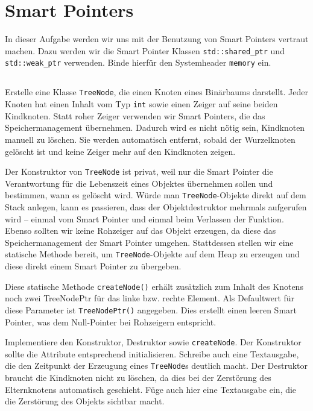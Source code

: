 \section{\ExercisePrefixMemory Smart Pointers}
In dieser Aufgabe werden wir uns mit der Benutzung von Smart Pointers vertraut machen. Dazu werden wir die Smart Pointer Klassen \lstinline{std::shared_ptr} und \lstinline{std::weak_ptr} verwenden. Binde hierfür den Systemheader \lstinline{memory} ein.


\subsection{}
Erstelle eine Klasse \lstinline{TreeNode}, die einen Knoten eines Binärbaums darstellt.
Jeder Knoten hat einen Inhalt vom Typ \lstinline{int} sowie einen Zeiger auf seine beiden Kindknoten.
Statt \glqq roher\grqq{} Zeiger verwenden wir Smart Pointers, die das Speichermanagement übernehmen.
Dadurch wird es nicht nötig sein, Kindknoten manuell zu löschen.
Sie werden automatisch entfernt, sobald der Wurzelknoten gelöscht ist und keine Zeiger mehr auf den Kindknoten zeigen.


Der Konstruktor von \lstinline{TreeNode} ist privat, weil nur die Smart Pointer die Verantwortung für die Lebenszeit eines Objektes übernehmen sollen und bestimmen, wann es gelöscht wird.
Würde man \lstinline{TreeNode}-Objekte direkt auf dem Stack anlegen, kann es passieren, dass der Objektdestruktor mehrmals aufgerufen wird -- einmal vom Smart Pointer und einmal beim Verlassen der Funktion.
Ebenso sollten wir keine Rohzeiger auf das Objekt erzeugen, da diese das Speichermanagement der Smart Pointer umgehen.
Stattdessen stellen wir eine statische Methode bereit, um \lstinline{TreeNode}-Objekte auf dem Heap zu erzeugen und diese direkt einem Smart Pointer zu übergeben.

Diese statische Methode \lstinline{createNode()} erhält zusätzlich zum Inhalt des Knotens noch zwei TreeNodePtr für das linke bzw. rechte Element.
Als Defaultwert für diese Parameter ist \lstinline{TreeNodePtr()} angegeben. Dies erstellt einen leeren Smart Pointer, was dem Null-Pointer bei Rohzeigern entspricht.

Implementiere den Konstruktor, Destruktor sowie \lstinline{createNode}.
Der Konstruktor sollte die Attribute entsprechend initialisieren.
Schreibe auch eine Textausgabe, die den Zeitpunkt der Erzeugung eines \lstinline{TreeNode}s deutlich macht.
Der Destruktor braucht die Kindknoten nicht zu löschen, da dies bei der Zerstörung des Elternknotens automatisch geschieht.
Füge auch hier eine Textausgabe ein, die die Zerstörung des Objekts sichtbar macht.

